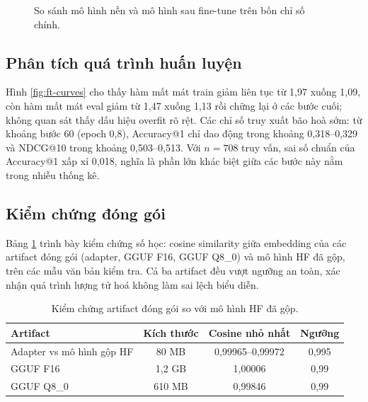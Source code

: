 \begin{figure}[htbp]
\centering
{}
\caption{So sánh mô hình nền và mô hình sau fine-tune trên bốn chỉ số chính.}
\label{fig:ft-bars}
\end{figure}

\subsection{Phân tích quá trình huấn luyện}

Hình \ref{fig:ft-curves} cho thấy hàm mất mát train giảm liên tục từ 1,97 xuống 1,09, còn hàm
mất mát eval giảm từ 1,47 xuống 1,13 rồi chững lại ở các bước cuối; không quan sát thấy dấu
hiệu overfit rõ rệt. Các chỉ số truy xuất bão hoà sớm: từ khoảng bước 60 (epoch 0,8),
Accuracy@1 chỉ dao động trong khoảng 0,318--0,329 và NDCG@10 trong khoảng 0,503--0,513. Với
$n=708$ truy vấn, sai số chuẩn của Accuracy@1 xấp xỉ 0,018, nghĩa là phần lớn khác biệt giữa
các bước này nằm trong nhiễu thống kê.

\subsection{Kiểm chứng đóng gói}

Bảng \ref{tab:ft-deploy} trình bày kiểm chứng số học: cosine similarity giữa embedding của
các artifact đóng gói (adapter, GGUF F16, GGUF Q8\_0) và mô hình HF đã gộp, trên các mẫu văn
bản kiểm tra. Cả ba artifact đều vượt ngưỡng an toàn, xác nhận quá trình lượng tử hoá không
làm sai lệch biểu diễn.

\begin{table}[htbp]
\centering
\caption{Kiểm chứng artifact đóng gói so với mô hình HF đã gộp.}
\label{tab:ft-deploy}
\small
\begin{tabular}{@{}lccc@{}}
\toprule
\textbf{Artifact} & \textbf{Kích thước} & \textbf{Cosine nhỏ nhất} & \textbf{Ngưỡng} \\
\midrule
Adapter vs mô hình gộp HF & 80 MB    & 0{,}99965--0{,}99972 & 0{,}995 \\
GGUF F16                  & 1,2 GB   & 1{,}00006            & 0,99 \\
GGUF Q8\_0                & 610 MB   & 0{,}99846            & 0,99 \\
\bottomrule
\end{tabular}
\end{table}

